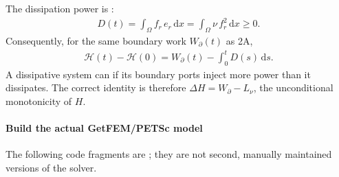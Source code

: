 \documentclass[letterpaper,10pt,english]{sphinxmanual}
\begin{document}
\sphinxAtStartPar
The dissipation power is :
\begin{equation}\label{equation:examples/wave:wave2b_dissipated_power}
\begin{split}D(t)=\int_\Omega f_r\,e_r\,\mathrm dx
    =\int_\Omega \nu\,f_r^2\,\mathrm dx\geq0.\end{split}
\end{equation}
\sphinxAtStartPar
Consequently, for the same boundary work
\(W_\partial(t)\) as 2A,
\begin{equation}\label{equation:examples/wave:wave2b_energy_dissipation}
\begin{split}\mathcal H(t)-\mathcal H(0)
= W_\partial(t)-\int_0^t D(s)\,\mathrm ds.\end{split}
\end{equation}
\sphinxAtStartPar
A dissipative system can 
if its boundary ports inject more power than it dissipates.
The correct identity is therefore
\(\Delta H=W_\partial-L_\nu\), 
the unconditional monotonicity of \(H\).


\paragraph{Build the actual GetFEM/PETSc model}
\label{\detokenize{examples/wave:build-the-actual-getfem-petsc-model}}
\sphinxAtStartPar
The following code fragments are 
; they are not second,
manually maintained versions of the solver.

\sphinxAtStartPar
{}
\end{document}
